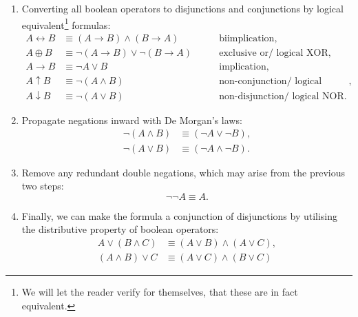 \begin{enumerate}
    \item Converting all boolean operators to disjunctions and conjunctions by logical equivalent\footnote{We will let the reader verify for themselves, that these are in fact equivalent.} formulas:
    \begin{align*}
        A \leftrightarrow B &\equiv (A \rightarrow  B) \wedge (B \rightarrow A) \qquad &\text{biimplication},
        \\
        A \oplus B &\equiv \neg (A \rightarrow B) \vee \neg (B \rightarrow A) \qquad &\text{exclusive or/ logical XOR},
        \\
        A \rightarrow B &\equiv \neg A \vee B \qquad &\text{implication},
        \\
        A \uparrow B &\equiv \neg (A \wedge B) \qquad &\text{non-conjunction/ logical NAND},
        \\
        A \downarrow B &\equiv \neg (A \vee B) \qquad &\text{non-disjunction/ logical NOR}.
    \end{align*}
    \item Propagate negations inward with De Morgan's laws\cite{A-Concise-Introduction-to-Logic,Introduction-to-logic,Math-Logic-for-CompSci}:
    \begin{align*}
        \neg (A \wedge B) &\equiv (\neg A \vee \neg B),
        \\
        \neg (A \vee B) &\equiv (\neg A \wedge \neg B).
    \end{align*}
    \item Remove any redundant double negations, which may arise from the previous two steps:
    \begin{equation*}
        \neg \neg A \equiv A.
    \end{equation*}
    \item Finally, we can make the formula a conjunction of disjunctions by utilising the distributive property of boolean operators:
    \begin{align*}
        A \vee (B \wedge C) &\equiv (A \vee B) \wedge (A \vee C),
        \\
        (A \wedge B) \vee C &\equiv (A \vee C) \wedge (B \vee C) \tag*{\(\blacksquare\).}
    \end{align*}
\end{enumerate}

